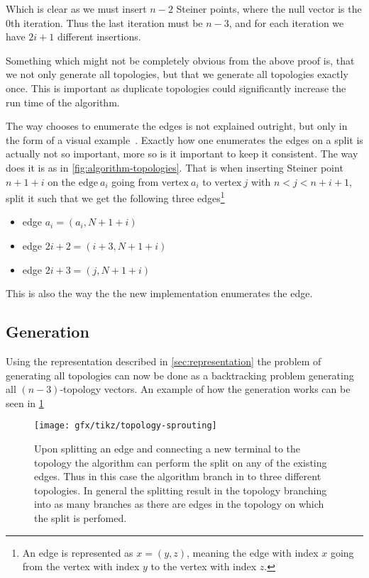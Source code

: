 Which is clear as we must insert $n-2$ Steiner points, where the null vector is
the $0$th iteration. Thus the last iteration must be $n-3$, and for each
iteration we have $2i+1$ different insertions.

Something which might not be completely obvious from the above proof is, that we
not only generate all topologies, but that we generate all topologies exactly
once. This is important as duplicate topologies could significantly
increase the run time of the algorithm.


The way \citeauthor{smith1992} chooses to enumerate the edges is not explained outright, but only
in the form of a visual example~\cite[p.~143]{smith1992}. Exactly how one
enumerates the edges on a split is actually not so important, more so is it
important to keep it consistent. The way \citeauthor{smith1992} does it is as in
\cref{fig:algorithm-topologies}. That is when inserting Steiner point $n+1+i$
on the $\text{edge}~a_{i}$ going from $\text{vertex}~a_i$ to $\text{vertex}~j$
with $n < j < n+i+1$, split it such that we get the following three
edges\footnote{An edge is represented as $x = (y, z)$, meaning the edge with
  index $x$ going from the vertex with index $y$ to the vertex with index
  $z$.}

\begin{itemize}
\item edge $a_{i} = (a_{i},N+1+i)$
\item edge $ 2i + 2 = (i+3,N+1+i)$
\item edge $ 2i + 3 = (j,N+1+i)$
\end{itemize}

This is also the way the the new implementation enumerates the edge.

\subsection{Generation}
\label{sec:generation}

Using the representation described in \cref{sec:representation} the problem of
generating all topologies can now be done as a backtracking problem generating
all $(n-3)$-topology vectors. An example of how the generation works can be seen
in \cref{fig:topology-sprouting}

\begin{figure}[htbp]
  \centering
  \texttt{[image: gfx/tikz/topology-sprouting]}
  \caption[Splitting of an edge]{Upon splitting an edge and connecting a new
    terminal to the topology the algorithm can perform the split on any of the
    existing edges. Thus in this case the algorithm branch in to three
    different topologies. In general the splitting result in the topology
    branching into as many branches as there are edges in the topology on which
    the split is perfomed.\label{fig:topology-sprouting}}
\end{figure}

